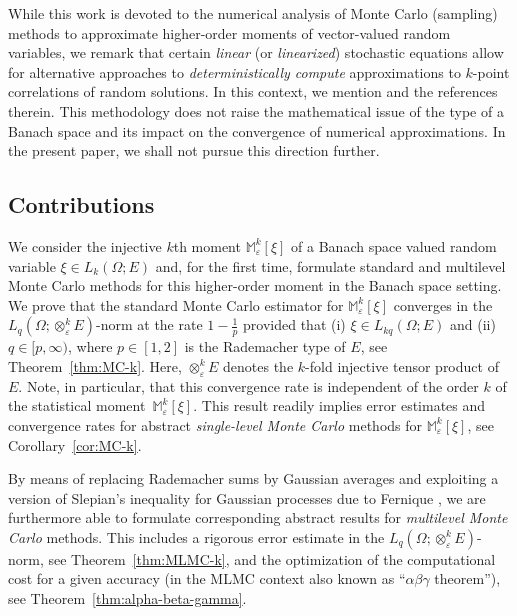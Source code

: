 \documentclass[reqno]{amsart}
\numberwithin{equation}{section}
\newcommand{\bbM}{\mathbb{M}}
\newcommand{\xkeps}{\otimes^k_\varepsilon}
\newcommand{\Mk}{\bbM^k_\varepsilon}
\theoremstyle{remark}
\theoremstyle{definition}
\begin{document}
While this work is devoted to the numerical analysis
of Monte Carlo (sampling) methods 
to approximate higher-order moments 
of vector-valued random variables, 
we remark that 
certain \emph{linear} (or \emph{linearized}) 
stochastic equations allow for 
alternative approaches 
to \emph{deterministically compute}  
approximations to $k$-point correlations
of random solutions. 
In this context, we mention
\cite{ChernovSchwab2013, Kirchner2020,KirchnerLangLarsson2017,
	KovacsLangPetersson2022,LangLarssonSchwab2013}
and the references therein. 
This methodology does not raise  
the mathematical issue of the type of 
a Banach space and its impact 
on the convergence of 
numerical approximations. 
In the present paper, we
shall not pursue this direction further.


\subsection{Contributions}\label{subsec:contributions} 

We consider the injective $k$th moment $\Mk[\xi]$ 
of a Banach space valued random variable 
$\xi\in L_k(\Omega;E)$ and, for the first time, 
formulate standard and multilevel Monte Carlo methods 
for this higher-order moment 
in the Banach space setting. 
We prove that the standard Monte Carlo estimator 
for $\Mk[\xi]$ converges in the 
$L_q(\Omega;\xkeps E)$-norm 
at the rate $1-\tfrac{1}{p}$ 
provided that 
(i) $\xi\in L_{kq}(\Omega;E)$  
and 
(ii) $q\in[p,\infty)$, where $p\in[1,2]$ is  
the Rademacher type of $E$, 
see Theorem~\ref{thm:MC-k}. 
Here, $\xkeps E$ denotes the 
$k$-fold injective tensor product of $E$. 
Note, in particular, that\linebreak  
this convergence rate 
is independent of the order $k$ 
of the statistical moment~$\Mk[\xi]$. 
This result readily implies error estimates 
and convergence rates for abstract 
\emph{single-level Monte Carlo} methods 
for $\Mk[\xi]$, see Corollary~\ref{cor:MC-k}. 

By means of replacing Rademacher sums  
by Gaussian averages and exploiting 
a version of Slepian's inequality for Gaussian processes 
due to Fernique \cite{Fernique1975}, 
we are furthermore able to formulate 
corresponding abstract results 
for \emph{multilevel Monte Carlo} methods. 
This includes a rigorous error estimate 
in the $L_q(\Omega;\xkeps E)$-norm, 
see Theorem~\ref{thm:MLMC-k}, 
and the optimization of the computational cost  
for a given accuracy 
(in the MLMC context also known as 
``$\alpha\beta\gamma$ theorem''), 
see Theorem~\ref{thm:alpha-beta-gamma}. 
\end{document}
